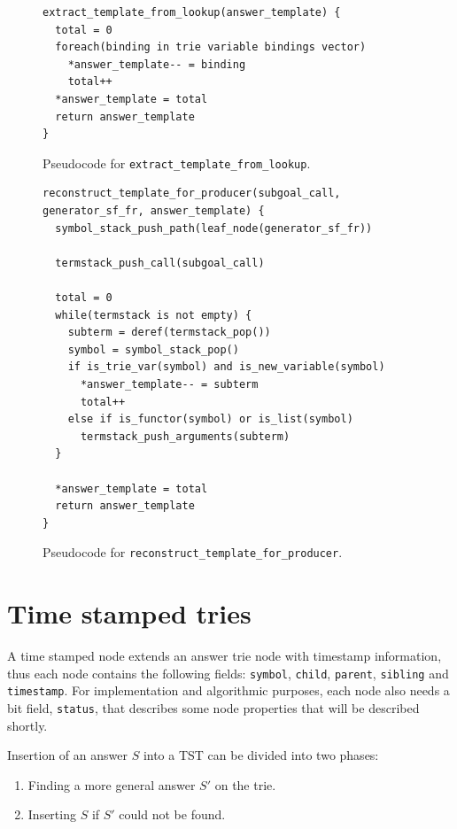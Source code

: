 \begin{figure}[ht]
\begin{Verbatim}[fontsize=\small]
extract_template_from_lookup(answer_template) {
  total = 0
  foreach(binding in trie variable bindings vector)
    *answer_template-- = binding
    total++
  *answer_template = total
  return answer_template
}
\end{Verbatim}
\caption{Pseudo\-code for \texttt{extract\_template\_from\_lookup}.}
\label{fig:extract_template_from_lookup}
\end{figure}

\begin{figure}[ht]
\begin{Verbatim}[fontsize=\small]
reconstruct_template_for_producer(subgoal_call, generator_sf_fr, answer_template) {
  symbol_stack_push_path(leaf_node(generator_sf_fr))
  
  termstack_push_call(subgoal_call)
  
  total = 0
  while(termstack is not empty) {
    subterm = deref(termstack_pop())
    symbol = symbol_stack_pop()
    if is_trie_var(symbol) and is_new_variable(symbol)
      *answer_template-- = subterm
      total++
    else if is_functor(symbol) or is_list(symbol)
      termstack_push_arguments(subterm)
  }
  
  *answer_template = total
  return answer_template
}
\end{Verbatim}
\caption{Pseudo\-code for \texttt{reconstruct\_template\_for\_producer}.}
\label{fig:reconstruct_template_for_producer}
\end{figure}

\section{Time stamped tries}

A time stamped node extends an answer trie node with timestamp information, thus
each node contains the following fields: \texttt{symbol}, \texttt{child}, \texttt{parent}, \texttt{sibling}
and \texttt{timestamp}. For implementation and algorithmic purposes, each node also needs a bit field,
\texttt{status}, that describes some node properties that will be described shortly.

Insertion of an answer $S$ into a TST can be divided into two phases:

\begin{enumerate}
  \item Finding a more general answer $S'$ on the trie.
  \item Inserting $S$ if $S'$ could not be found.
\end{enumerate}

